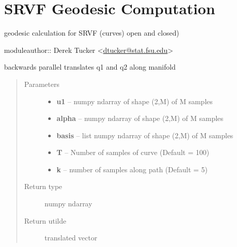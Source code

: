 \documentclass[letterpaper,10pt,english]{sphinxmanual}
\begin{document}
\chapter{SRVF Geodesic Computation}
\label{geodesic:module-geodesic}\label{geodesic:srvf-geodesic-computation}\label{geodesic::doc}
geodesic calculation for SRVF (curves) open and closed)

moduleauthor:: Derek Tucker \textless{}\href{mailto:dtucker@stat.fsu.edu}{dtucker@stat.fsu.edu}\textgreater{}

\begin{fulllineitems}
\label{geodesic:geodesic.back_parallel_transport}
backwards parallel translates q1 and q2 along manifold
\begin{quote}\begin{description}
\item[{Parameters}] \leavevmode\begin{itemize}
\item {} 
\textbf{u1} -- numpy ndarray of shape (2,M) of M samples

\item {} 
\textbf{alpha} -- numpy ndarray of shape (2,M) of M samples

\item {} 
\textbf{basis} -- list numpy ndarray of shape (2,M) of M samples

\item {} 
\textbf{T} -- Number of samples of curve (Default = 100)

\item {} 
\textbf{k} -- number of samples along path (Default = 5)

\end{itemize}

\item[{Return type}] \leavevmode
numpy ndarray

\item[{Return utilde}] \leavevmode
translated vector

\end{description}\end{quote}

\end{fulllineitems}

\end{document}
